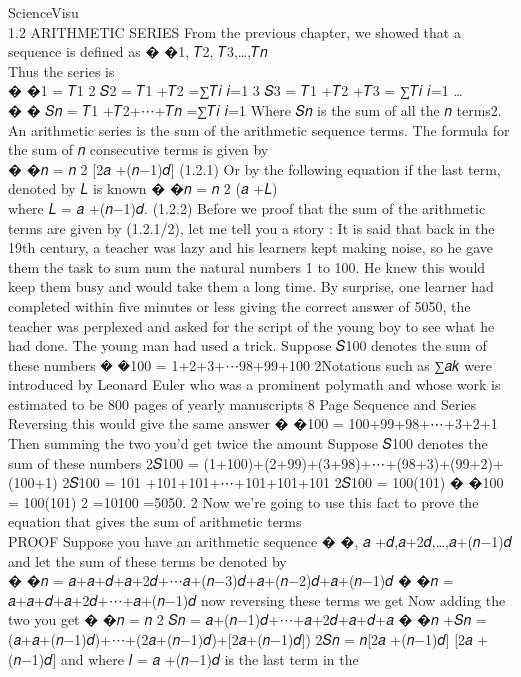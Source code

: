 \documentclass[
  letterpaper,
  DIV=11,
  numbers=noendperiod]{scrreprt}
\begin{document}
ScienceVisu\\
1.2 ARITHMETIC SERIES From the previous chapter, we showed that a
sequence is defined as � �1, 𝑇2, 𝑇3,\ldots,𝑇𝑛\\
Thus the series is\\
� �1 = 𝑇1 2 𝑆2 = 𝑇1 +𝑇2 =∑𝑇𝑖 𝑖=1 3 𝑆3 = 𝑇1 +𝑇2 +𝑇3 = ∑𝑇𝑖 𝑖=1 \ldots{}\\
� � 𝑆𝑛 = 𝑇1 +𝑇2+⋯+𝑇𝑛 =∑𝑇𝑖 𝑖=1 Where 𝑆𝑛 is the sum of all the 𝑛 terms2.
An arithmetic series is the sum of the arithmetic sequence terms. The
formula for the sum of 𝑛 consecutive terms is given by\\
� �𝑛 = 𝑛 2 {[}2𝑎 +(𝑛−1)𝑑{]} (1.2.1) Or by the following equation if the
last term, denoted by 𝐿 is known � �𝑛 = 𝑛 2 (𝑎 +𝐿)\\
where 𝐿 = 𝑎 +(𝑛−1)𝑑. (1.2.2) Before we proof that the sum of the
arithmetic terms are given by (1.2.1/2), let me tell you a story : It is
said that back in the 19th century, a teacher was lazy and his learners
kept making noise, so he gave them the task to sum num the natural
numbers 1 to 100. He knew this would keep them busy and would take them
a long time. By surprise, one learner had completed within five minutes
or less giving the correct answer of 5050, the teacher was perplexed and
asked for the script of the young boy to see what he had done. The young
man had used a trick. Suppose 𝑆100 denotes the sum of these numbers �
�100 = 1+2+3+⋯98+99+100 2Notations such as ∑𝑎𝑘 were introduced by
Leonard Euler who was a prominent polymath and whose work is estimated
to be 800 pages of yearly manuscripts 8 \textbar{} Page Sequence and
Series\\
Reversing this would give the same answer � �100 = 100+99+98+⋯+3+2+1
Then summing the two you'd get twice the amount Suppose 𝑆100 denotes the
sum of these numbers 2𝑆100 =
(1+100)+(2+99)+(3+98)+⋯+(98+3)+(99+2)+(100+1) 2𝑆100 = 101
+101+101+⋯+101+101+101 2𝑆100 = 100(101) � �100 = 100(101) 2 =10100
=5050. 2 Now we're going to use this fact to prove the equation that
gives the sum of arithmetic terms\\
PROOF Suppose you have an arithmetic sequence � �, 𝑎
+𝑑,𝑎+2𝑑,\ldots,𝑎+(𝑛−1)𝑑\\
and let the sum of these terms be denoted by\\
� �𝑛 = 𝑎+𝑎+𝑑+𝑎+2𝑑+⋯𝑎+(𝑛−3)𝑑+𝑎+(𝑛−2)𝑑+𝑎+(𝑛−1)𝑑 � �𝑛 =
𝑎+𝑎+𝑑+𝑎+2𝑑+⋯+𝑎+(𝑛−1)𝑑 now reversing these terms we get Now adding the
two you get � �𝑛 = 𝑛 2 𝑆𝑛 = 𝑎+(𝑛−1)𝑑+⋯+𝑎+2𝑑+𝑎+𝑑+𝑎 � �𝑛 +𝑆𝑛 =
(𝑎+𝑎+(𝑛−1)𝑑)+⋯+(2𝑎+(𝑛−1)𝑑)+{[}2𝑎+(𝑛−1)𝑑{]}) 2𝑆𝑛 = 𝑛{[}2𝑎 +(𝑛−1)𝑑{]}
{[}2𝑎 +(𝑛−1)𝑑{]} and where 𝑙 = 𝑎 +(𝑛−1)𝑑 is the last term in the
\end{document}

